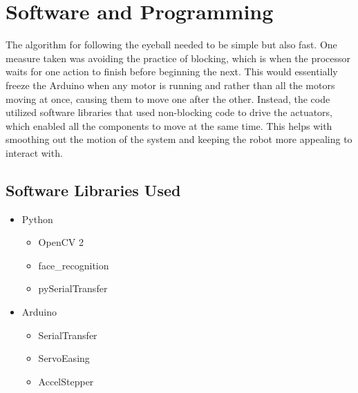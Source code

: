 \section{Software and Programming}
The algorithm for following the eyeball needed to be simple but also fast. One measure taken was avoiding the practice of blocking, which is when the processor waits for one action to finish before beginning the next. This would essentially freeze the Arduino when any motor is running and rather than all the motors moving at once, causing them to move one after the other. Instead, the code utilized software libraries that used non-blocking code to drive the actuators, which enabled all the components to move at the same time. This helps with smoothing out the motion of the system and keeping the robot more appealing to interact with. 

\subsection{Software Libraries Used}
\begin{itemize}
    \item Python
    \begin{itemize}
       \item OpenCV 2 \cite{OpencvOpencv2023}
        \item face\_recognition \cite{geitgeyFaceRecognition2023a}
        \item pySerialTransfer \cite{powerbroker2PySerialTransfer2023}
    \end{itemize}
    \item Arduino
    \begin{itemize}
        \item SerialTransfer \cite{pb2SerialTransfer2023}
        \item ServoEasing \cite{arminServoEasing2023}
        \item AccelStepper \cite{AccelStepperAccelStepperLibrary}
    \end{itemize}
\end{itemize}

